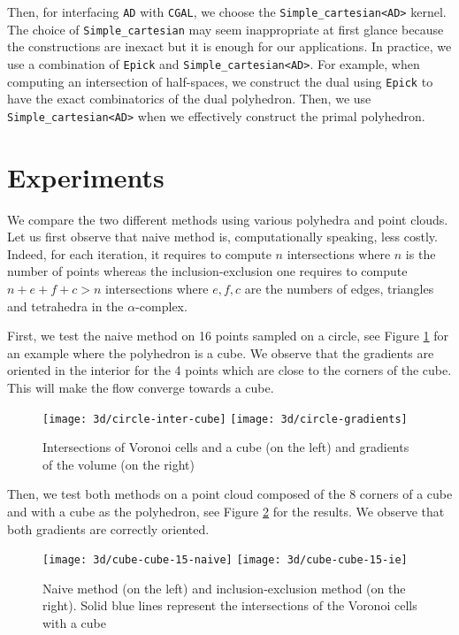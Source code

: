 Then, for interfacing \texttt{AD} with \texttt{CGAL}, we choose the
\texttt{Simple\_cartesian<AD>} kernel. The choice of \texttt{Simple\_cartesian}
may seem inappropriate at first glance because the constructions are inexact but
it is enough for our applications. In practice, we use a combination of
\texttt{Epick} and \texttt{Simple\_cartesian<AD>}. For example, when computing
an intersection of half-spaces, we construct the dual using \texttt{Epick} to
have the exact combinatorics of the dual polyhedron. Then, we use
\texttt{Simple\_cartesian<AD>} when we effectively construct the primal
polyhedron.

\section{Experiments}

We compare the two different methods using various polyhedra and point clouds.
Let us first observe that naive method is, computationally speaking, less
costly. Indeed, for each iteration, it requires to compute $ n $ intersections
where $ n $ is the number of points whereas the inclusion-exclusion one requires
to compute $ n + e + f + c > n $ intersections where $ e, f, c $ are the numbers
of edges, triangles and tetrahedra in the $ \alpha $-complex.

First, we test the naive method on 16 points sampled on a circle, see Figure
\ref{fig:3d-circle} for an example where the polyhedron is a cube. We observe
that the gradients are oriented in the interior for the 4 points which are close
to the corners of the cube. This will make the flow converge towards a cube.

\begin{figure}[h]
    \centering
    \texttt{[image: 3d/circle-inter-cube]}
    \texttt{[image: 3d/circle-gradients]}
    \caption{Intersections of Voronoi cells and a cube (on the left) and
        gradients of the volume (on the right)}
    \label{fig:3d-circle}
\end{figure}

Then, we test both methods on a point cloud composed of the 8 corners of a cube
and with a cube as the polyhedron, see Figure \ref{fig:3d-cube-comparison} for
the results. We observe that both gradients are correctly oriented.

\begin{figure}[h]
    \centering
    \texttt{[image: 3d/cube-cube-15-naive]}
    \texttt{[image: 3d/cube-cube-15-ie]}
    \caption{Naive method (on the left) and inclusion-exclusion method (on the
        right). Solid blue lines represent the intersections of the Voronoi
        cells with a cube}
    \label{fig:3d-cube-comparison}
\end{figure}

